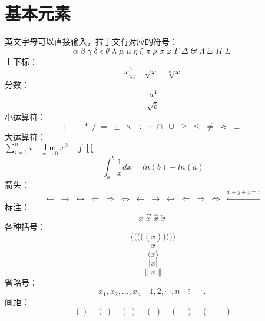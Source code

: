 \documentclass{article}
\begin{document}
		\section{基本元素}
		英文字母可以直接输入，拉丁文有对应的符号：\\
		\[
		\alpha\;\beta\;\gamma\;\delta\;\epsilon\;\theta\;\lambda\;\mu\;
		\mu\;\eta\;\xi\;\pi\;\rho\;\sigma\;\varphi\;\Gamma\;\Delta\;\Theta\;
		\Lambda\;\Xi\;\Pi\;\Sigma\;
		\]
		上下标：
		\[
		x_{i,j}^{2} \quad \sqrt{x} \quad \sqrt[n]{x}
		\]
		分数：
		\[
		\frac{a^3}{\sqrt{b}}
		\]
		小运算符：
		\[
		+ \; - \; * \; / \; = \; \pm \; \times \; \div\;  \cdot\; \cap\; \cup\; \geq\;  \leq\; \neq\;
		\approx\; \equiv\;
		\]
		大运算符： \\
		$\sum\limits_{i=1}^{n} i \quad \lim\limits_{x\to 0} x^2 \quad \int \prod $
		\[
		\int_{a}^{b}\frac{1}{x}dx = ln(b) - ln(a)
		\]
		箭头：\\
		\[
		\leftarrow\;\rightarrow\;\leftrightarrow\;\Leftarrow\;\Rightarrow\;\Leftrightarrow\;
		\longleftarrow\;\longrightarrow\;\longleftrightarrow\;\Longleftarrow\;\Longrightarrow\;\Longleftrightarrow\;
		\xleftarrow{x+y+z=r}
		\]
		标注：\\
		\[
		\bar{x} \; \vec{x} \; \hat{x} \; \check{x}\;
		\]
		各种括号：\\
		\[ 	\Bigg ( \bigg ( \Big ( \big ( (x) \big ) \Big ) \bigg ) \Bigg )  \]  
		\[ [x]  \]
 		\[ \langle x\rangle \]
		\[ \lvert x \rvert \]
		\[ \lVert x \rVert \]
		省略号：\\
		\[
			x_1, x_2, \dots , x_n \quad 1 , 2, \cdots , n \quad \vdots \quad \ddots 
		\]
		间距：\\
		\[
		(\!) \quad (\,) \quad (\:) \quad (\;) \quad (\quad) \quad (\qquad) 
		\]
\end{document}
